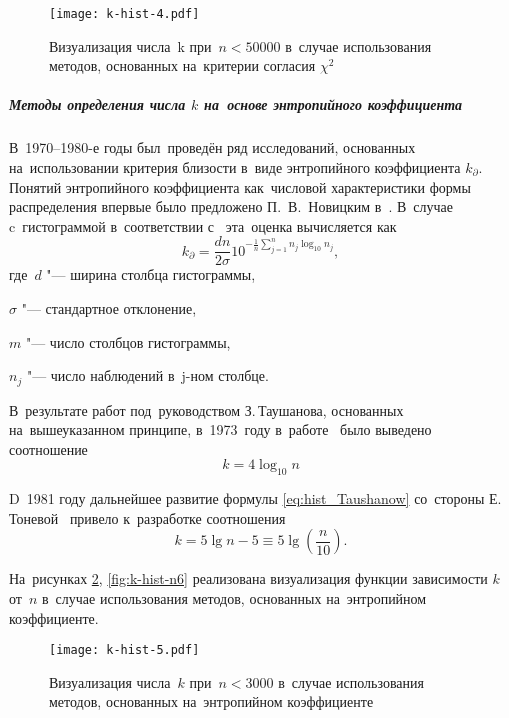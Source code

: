 \documentclass[]{scrartcl}
\begin{document}
\begin{figure}[ht]
	\centering %
	\texttt{[image: k-hist-4.pdf]}
	\caption{Визуализация числа~k при~$n < 50000$ в~случае использования методов, основанных на~критерии согласия $\chi^2$}\label{fig:k-hist-n4}
\end{figure}
\subparagraph{Методы определения числа $k$ на~основе энтропийного коэффициента}\label{k-hist:entrop-methods}

В~1970--1980-е годы был~проведён ряд исследований, основанных на~использовании критерия близости в~виде энтропийного коэффициента $k_\partial$. Понятий энтропийного коэффициента как~числовой характеристики формы распределения впервые было предложено П.~В.~Новицким в~\cite{Nowiczkij:Entrop-koef}. В~случае c~гистограммой в~соответствии с~\cite{Nowiczkij:Elektrich} эта~оценка вычисляется как
\begin{equation}\label{eq:hist_Nowiczkij}
k_\partial = \frac{dn}{2\sigma}10^{-\frac{1}{n}\sum\limits_{j=1}^n n_j \log_{10}n_j},
\end{equation}
где~$d$ "--- ширина столбца гистограммы,

$\sigma$ "--- стандартное отклонение,

$m$ "--- число столбцов гистограммы,

$n_j$ "--- число наблюдений в~j-ном столбце.

В~результате работ  под~руководством З.\,Таушанова, основанных на~вышеуказанном принципе, в~1973~году в~работе~\cite{Taushanow-k-hist} было выведено соотношение
\begin{equation}\label{eq:hist_Taushanow}
k = 4 \log_{10}{n}
\end{equation}

D~1981 году дальнейшее развитие формулы \ref{eq:hist_Taushanow} со~стороны Е.\,Тоневой~\cite{Tonewa:k-hist} привело к~разработке соотношения
\begin{equation}\label{eq:hist_Tonewa}
k = 5 \lg n - 5 \equiv 5 \lg (\frac{n}{10}).
\end{equation}

На~рисунках \ref{fig:k-hist-n5}, \ref{fig:k-hist-n6} реализована визуализация функции зависимости $k$ от~$n$ в~случае использования методов, основанных на~энтропийном коэффициенте.

\begin{figure}[ht]
	\centering %
	\texttt{[image: k-hist-5.pdf]}
	\caption{Визуализация числа~$k$ при~$n < 3000$ в~случае использования методов, основанных на~энтропийном коэффициенте}\label{fig:k-hist-n5}
\end{figure}
\end{document}
